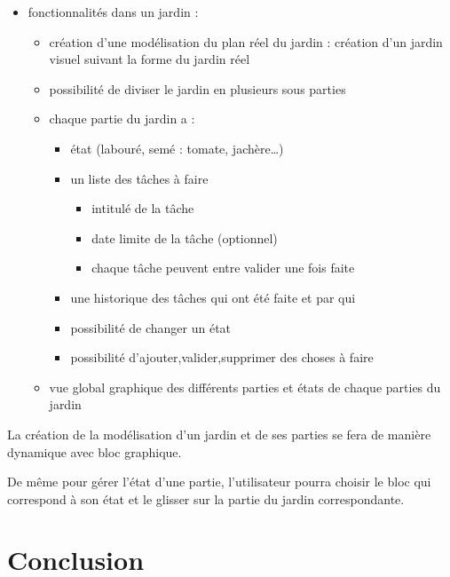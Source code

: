 \documentclass[french,a4paper]{article}
\begin{document}
\begin{itemize}
\begin{itemize}
          \end{itemize}
    \item fonctionnalités dans un jardin :
          \begin{itemize}
              \item création d’une modélisation du plan réel du jardin : création d’un jardin visuel suivant la forme du jardin réel
              \item  possibilité de diviser le jardin en plusieurs sous parties
              \item chaque partie du jardin a :
                    \begin{itemize}
                        \item état (labouré, semé : tomate, jachère…)
                        \item un liste des tâches à faire
                              \begin{itemize}
                                  \item intitulé de la tâche
                                  \item date limite de la tâche (optionnel)
                                  \item chaque tâche peuvent entre valider une fois faite
                              \end{itemize}
                        \item une historique des tâches qui ont été faite et par qui
                        \item possibilité de changer un état
                        \item possibilité d’ajouter,valider,supprimer des choses à faire
                    \end{itemize}
              \item vue global graphique des différents parties et états de chaque parties du jardin
          \end{itemize}
\end{itemize}
La création de la modélisation d’un jardin et de ses parties se fera de manière dynamique avec bloc graphique.

De même pour gérer l’état d’une partie, l’utilisateur pourra choisir le bloc qui correspond à son état et le glisser sur la partie du jardin correspondante.

\section{Conclusion}
\end{document}
